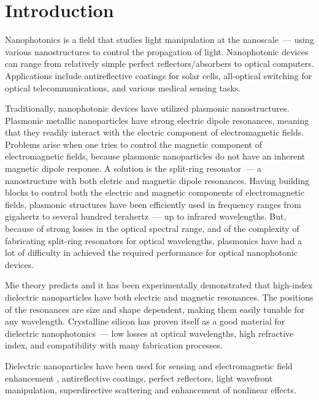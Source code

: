 \section*{Introduction}
\label{ch:Intro}
        Nanophotonics is a field that studies light manipulation at the nanoscale~--- using various nanostructures to control the
    propagation of light. Nanophotonic devices can range from relatively simple perfect reflectors/absorbers to optical computers.
    Applications include antireflective coatings for solar cells, all-optical switching for optical telecommunications, and various
    medical sensing tasks.

        Traditionally, nanophotonic devices have utilized plasmonic nanostructures. Plasmonic metallic nanoparticles have strong
    electric dipole resonances, meaning that they readily interact with the electric component of electromagnetic fields. Problems arise
    when one tries to control the magnetic component of electromagnetic fields, because plasmonic nanoparticles do not have an inherent
    magnetic dipole response. A solution is the split-ring resonator~--- a nanostructure with both eletric and magnetic dipole resonances.
    Having building blocks to control both the electric and magnetic components of electromagnetic fields, plasmonic structures have been efficiently
    used in frequency ranges from gigahertz to several hundred terahertz~--- up to infrared wavelengths. But, because of strong losses
    in the optical spectral range, and of the complexity of fabricating split-ring resonators for optical wavelengths, plasmonics have
    had a lot of difficulty in achieved the required performance for optical nanophotonic devices\cite{krasnok2015towards}.

        Mie theory\cite{mie1908beitrage} predicts and it has been experimentally demonstrated\cite{kuznetsov2012magnetic} that
        high-index dielectric nanoparticles have both electric and
    magnetic resonances. The positions of the resonances are size and shape dependent, making them easily tunable for any wavelength.
    Crystalline silicon has proven itself as a good material for dielectric nanophotonics~--- low losses at optical wavelengths\cite{palik1998handbook},
    high refractive index, and compatibility with many fabrication processes\cite{popa2008compact,zhao2009mie,evlyukhin2010optical,garcia2011strong,
    krasnok2012all,ginn2012realizing,fu2012directional,krasnok2015towards}.

        Dielectric nanoparticles have been used for sensing and electromagnetic field enhancement \cite{albella2013low,zambrana2015purcell,
    bakker2015magnetic,caldarola2015non}, antireflective coatings\cite{spinelli2012broadband},  perfect reflectors\cite{evlyukhin2010optical,
    moitra2014experimental}, light wavefront manipulation\cite{decker2015high,yu2015high}, superdirective scattering\cite{krasnok2014superdirective,
    krasnok2014experimental} and enhancement of nonlinear effects\cite{shcherbakov2014enhanced,makarov2015tuning}.

\clearpage

